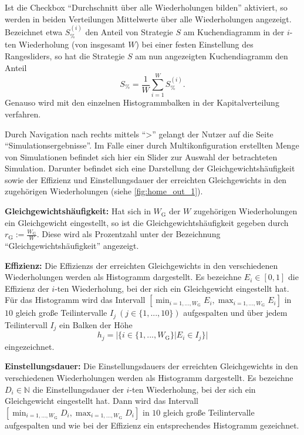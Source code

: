 \documentclass[parskip=full,11pt]{scrartcl}
\begin{document}
Ist die Checkbox \enquote{Durchschnitt über alle Wiederholungen bilden} aktiviert, so werden in beiden Verteilungen Mittelwerte über alle Wiederholungen angezeigt. Bezeichnet etwa \(S_\%^{(i)}\) den Anteil von Strategie \(S\) am Kuchendiagramm in der \(i\)-ten Wiederholung (von insgesamt \(W\)) bei einer festen Einstellung des Rangesliders, so hat die Strategie \(S\) am nun angezeigten Kuchendiagramm den Anteil
\[
S_\% = \frac 1W \sum_{i=1}^W S_\%^{(i)}.
\]
Genauso wird mit den einzelnen Histogrammbalken in der Kapitalverteilung verfahren.

Durch Navigation nach rechts mittels \enquote{>} gelangt der \Gls{Nutzer} auf die Seite \enquote{Simulationsergebnisse}. Im Falle einer durch Multikonfiguration erstellten Menge von Simulationen befindet sich hier ein Slider zur Auswahl der betrachteten Simulation. Darunter befindet sich eine Darstellung der Gleichgewichtshäufigkeit sowie der \Gls{Effizienz} und \Gls{Einstellungsdauer} der erreichten \Glspl{Gleichgewicht} in den zugehörigen Wiederholungen (siehe \cref{fig:home_out_1}).

\textbf{Gleichgewichtshäufigkeit:}
Hat sich in \(W_\text{G}\) der \(W\) zugehörigen Wiederholungen ein \Gls{Gleichgewicht} eingestellt, so ist die Gleichgewichtshäufigkeit gegeben durch \(r_\text{G} := \frac{W_\text{G}}{W}\). Diese wird als Prozentzahl unter der Bezeichnung \enquote{Gleichgewichtshäufigkeit} angezeigt.

\textbf{\Gls{Effizienz}:}
Die \Glspl{Effizienz} der erreichten \Glspl{Gleichgewicht} in den verschiedenen Wiederholungen werden als Histogramm dargestellt. Es bezeichne \(E_i \in [0,1]\) die \Gls{Effizienz} der \(i\)-ten Wiederholung, bei der sich ein \Gls{Gleichgewicht} eingestellt hat. Für das Histogramm wird das Intervall \([\min_{i = 1,...,W_\text{G}} E_i, \max_{i = 1,...,W_\text{G}} E_i]\) in \(10\) gleich große Teilintervalle \(I_j  \ (j \in \{1,...,10\})\) aufgespalten und über jedem Teilintervall \(I_j\) ein Balken der Höhe
\[
h_j = |\{i \in \{1,...,W_\text{G}\} | E_i \in I_j\}|
\]
eingezeichnet.

\textbf{\Gls{Einstellungsdauer}:}
Die \Glspl{Einstellungsdauer} der erreichten \Glspl{Gleichgewicht} in den verschiedenen Wiederholungen werden als Histogramm dargestellt. Es bezeichne \(D_i \in \mathbb{N}\) die \Gls{Einstellungsdauer} der \(i\)-ten Wiederholung, bei der sich ein \Gls{Gleichgewicht} eingestellt hat. Dann wird das Intervall \([\min_{i = 1,...,W_\text{G}} D_i, \max_{i = 1,...,W_\text{G}} D_i]\) in \(10\) gleich große Teilintervalle aufgespalten und wie bei der \Gls{Effizienz} ein entsprechendes Histogramm gezeichnet. 
\end{document}

